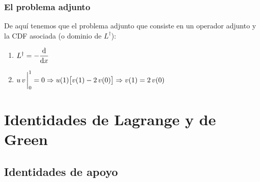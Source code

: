 \documentclass[12pt]{beamer}
\begin{document}
\begin{frame}
\frametitle{El problema adjunto}
De aquí tenemos que el problema adjunto que consiste en un operador adjunto y la CDF asociada (o dominio de $L^{\dagger}$):
\pause
{}
\begin{enumerate}[<+->]
\item $L^{\dagger} = - \displaystyle \dv{x}$
\item $\displaystyle u \, v \eval_{0}^{1} = 0 \Rightarrow u (1) \big[ v(1) - 2 \, v(0) \big] \Rightarrow v (1) = 2 \, v(0)$
\end{enumerate}
\end{frame}


\section{Identidades de Lagrange y de Green}
\subsection{Identidades de apoyo}
\end{document}
